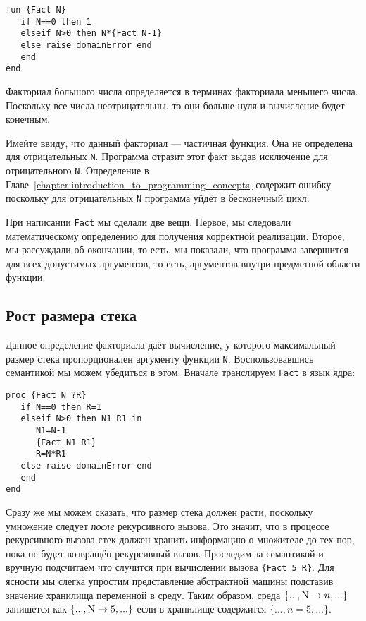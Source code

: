 \begin{lstlisting}
fun {Fact N}
   if N==0 then 1
   elseif N>0 then N*{Fact N-1}
   else raise domainError end
   end
end
\end{lstlisting}

Факториал большого числа определяется в терминах факториала меньшего числа. Поскольку все числа неотрицательны, то они больше нуля и вычисление будет конечным.

Имейте ввиду, что данный факториал --- частичная функция. Она не определена для отрицательных \lstinline!N!. Программа отразит этот факт выдав исключение для отрицательного \lstinline!N!. Определение в Главе~\ref{chapter:introduction_to_programming_concepts} содержит ошибку поскольку для отрицательных \lstinline!N! программа уйдёт в бесконечный цикл.

При написании \lstinline!Fact! мы сделали две вещи. Первое, мы следовали математическому определению для получения корректной реализации. Второе, мы рассуждали об окончании, то есть, мы показали, что программа завершится для всех допустимых аргументов, то есть, аргументов внутри предметной области функции.

\subsection{Рост размера стека}

Данное определение факториала даёт вычисление, у которого максимальный размер стека пропорционален аргументу функции \lstinline!N!. Воспользовавшись семантикой мы можем убедиться в этом. Вначале транслируем \lstinline!Fact! в язык ядра:

\begin{lstlisting}
proc {Fact N ?R}
   if N==0 then R=1
   elseif N>0 then N1 R1 in
      N1=N-1
      {Fact N1 R1}
      R=N*R1
   else raise domainError end
   end
end
\end{lstlisting}

Сразу же мы можем сказать, что размер стека должен расти, поскольку умножение следует \emph{после} рекурсивного вызова. Это значит, что в процессе рекурсивного вызова стек должен хранить информацию о множителе до тех пор, пока не будет возвращён рекурсивный вызов. Проследим за семантикой и вручную подсчитаем что случится при вычислении вызова \lstinline!{Fact 5 R}!. Для ясности мы слегка упростим представление абстрактной машины подставив значение хранилища переменной в среду. Таким образом, среда $\{..., \text{\lstinline!N!} \to n, ...\}$ запишется как $\{..., \text{\lstinline!N!} \to 5, ...\}$ если в хранилище содержится $\{..., n=5, ...\}$.


